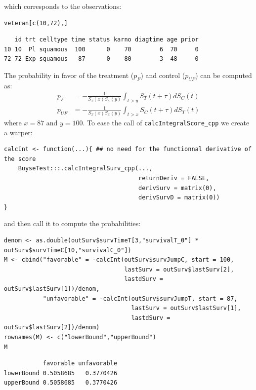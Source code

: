 \documentclass[12pt]{article}
\begin{document}
which corresponds to the observations:
\lstset{language=r,label= ,caption= ,captionpos=b,numbers=none}
\begin{lstlisting}
veteran[c(10,72),]
\end{lstlisting}

\begin{verbatim}
   id trt celltype time status karno diagtime age prior
10 10  Pl squamous  100      0    70        6  70     0
72 72 Exp squamous   87      0    80        3  48     0
\end{verbatim}


The probability in favor of the treatment (\(p_F\)) and control (\(p_{UF}\)) can be computed
as:
\begin{align*}
p_F &= -\frac{1}{S_T(x)S_C(y)}\int_{t>y} S_T(t+\tau) dS_C(t) \\
p_{UF} &= -\frac{1}{S_T(x)S_C(y)}\int_{t>x} S_C(t+\tau) dS_T(t)
\end{align*}
where \(x=87\) and \(y=100\). To ease the call of \texttt{calcIntegralScore\_cpp} we create a warper:
\lstset{language=r,label= ,caption= ,captionpos=b,numbers=none}
\begin{lstlisting}
calcInt <- function(...){ ## no need for the functionnal derivative of the score 
    BuyseTest:::.calcIntegralSurv_cpp(..., 
                                      returnDeriv = FALSE, 
                                      derivSurv = matrix(0), 
                                      derivSurvD = matrix(0))
}
\end{lstlisting}

and then call it to compute the probabilities:
\lstset{language=r,label= ,caption= ,captionpos=b,numbers=none}
\begin{lstlisting}
denom <- as.double(outSurv$survTimeT[3,"survivalT_0"] * outSurv$survTimeC[10,"survivalC_0"])
M <- cbind("favorable" = -calcInt(outSurv$survJumpC, start = 100, 
                                  lastSurv = outSurv$lastSurv[2],
                                  lastdSurv = outSurv$lastSurv[1])/denom,
           "unfavorable" = -calcInt(outSurv$survJumpT, start = 87, 
                                    lastSurv = outSurv$lastSurv[1],
                                    lastdSurv = outSurv$lastSurv[2])/denom)
rownames(M) <- c("lowerBound","upperBound")
M
\end{lstlisting}

\begin{verbatim}
           favorable unfavorable
lowerBound 0.5058685   0.3770426
upperBound 0.5058685   0.3770426
\end{verbatim}
\end{document}
